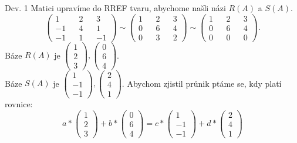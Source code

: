 \documentclass[a4paper]{article}
\begin{document}
\begin{section}{Dcv. 1}
    Matici upravíme do RREF tvaru, abychome našli názi $R(A)$ a $S(A)$.
    \[
        \begin{pmatrix} 1 && 2 && 3 \\
                        -1 && 4 && 1 \\
                        -1 && 1 && -1
        \end{pmatrix}   
        \sim
        \begin{pmatrix} 1 && 2 && 3 \\
                        0 && 6 && 4 \\
                        0 && 3 && 2
        \end{pmatrix}   
        \sim
        \begin{pmatrix} 1 && 2 && 3 \\
                        0 && 6 && 4 \\
                        0 && 0 && 0
        \end{pmatrix}   
    .\] 
    Báze $R(A)$ je $\begin{pmatrix} 1 \\ 2 \\ 3\end{pmatrix}, \begin{pmatrix} 0 \\ 6 \\ 4 \end{pmatrix}$.\\
            Báze $S(A)$ je $\begin{pmatrix} 1 \\ -1 \\ -1 \end{pmatrix}, \begin{pmatrix} 2 \\ 4 \\1 \end{pmatrix}$.
            Abychom zjistil průnik ptáme se, kdy platí rovnice: \[
            a*\begin{pmatrix} 1 \\ 2 \\ 3\end{pmatrix} + b*\begin{pmatrix} 0 \\ 6 \\ 4 \end{pmatrix} = c*\begin{pmatrix} 1 \\ -1 \\ -1 \end{pmatrix} + d*\begin{pmatrix} 2 \\ 4 \\1 \end{pmatrix}
\]
\end{section}
\end{document}

